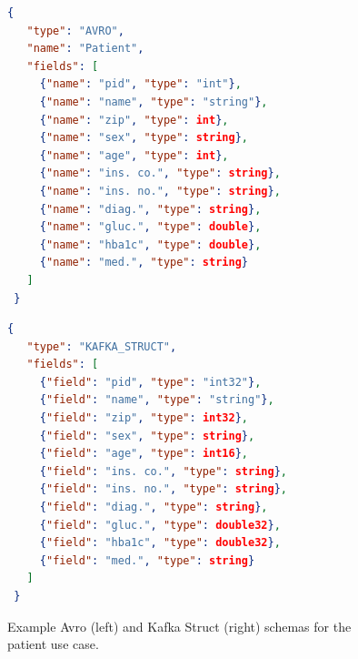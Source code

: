 \begin{figure}[ht]
   \centering
   \begin{minipage}{.45\textwidth}
     \begin{lstlisting}[language=json, basicstyle=\ttfamily\notsotiny, frame=tb]
 {
   "type": "AVRO",
   "name": "Patient",
   "fields": [
     {"name": "pid", "type": "int"},
     {"name": "name", "type": "string"},
     {"name": "zip", "type": int},
     {"name": "sex", "type": string},
     {"name": "age", "type": int},
     {"name": "ins. co.", "type": string},
     {"name": "ins. no.", "type": string},
     {"name": "diag.", "type": string},
     {"name": "gluc.", "type": double},
     {"name": "hba1c", "type": double},
     {"name": "med.", "type": string}
   ]
 }
     \end{lstlisting}
   \end{minipage}\hfill
   \begin{minipage}{.45\textwidth}
     \begin{lstlisting}[language=json, basicstyle=\ttfamily\notsotiny, frame=tb]
 {
   "type": "KAFKA_STRUCT",
   "fields": [
     {"field": "pid", "type": "int32"},
     {"field": "name", "type": "string"},
     {"field": "zip", "type": int32},
     {"field": "sex", "type": string},
     {"field": "age", "type": int16},
     {"field": "ins. co.", "type": string},
     {"field": "ins. no.", "type": string},
     {"field": "diag.", "type": string},
     {"field": "gluc.", "type": double32},
     {"field": "hba1c", "type": double32},
     {"field": "med.", "type": string}
   ]
 }
     \end{lstlisting}
   \end{minipage}
   \caption{Example Avro (left) and Kafka Struct (right) schemas for the patient use case.\label{fig:avro_kafkastruct_schemas}}
 \end{figure}

